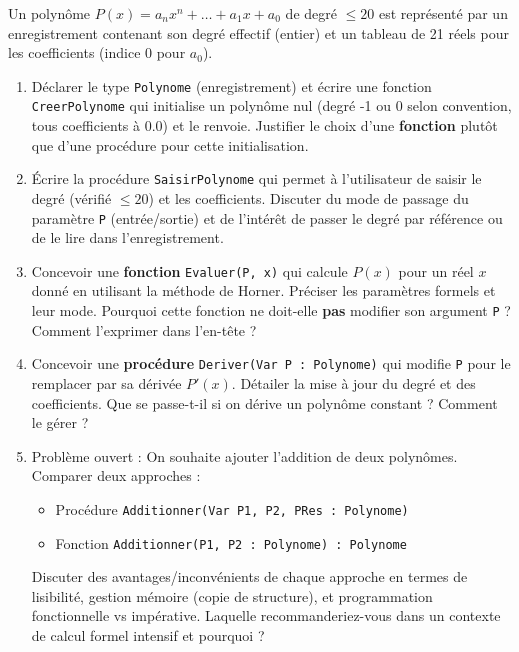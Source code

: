 \documentclass[11pt]{article}
\begin{document}
\begin{exercice}
Un polynôme $P(x) = a_n x^n + \dots + a_1 x + a_0$ de degré $\le 20$ est représenté par un enregistrement contenant son degré effectif (entier) et un tableau de 21 réels pour les coefficients (indice 0 pour $a_0$).

\begin{enumerate}
    \item Déclarer le type \texttt{Polynome} (enregistrement) et écrire une fonction \texttt{CreerPolynome} qui initialise un polynôme nul (degré -1 ou 0 selon convention, tous coefficients à 0.0) et le renvoie. Justifier le choix d'une \textbf{fonction} plutôt que d'une procédure pour cette initialisation.
    \item Écrire la procédure \texttt{SaisirPolynome} qui permet à l'utilisateur de saisir le degré (vérifié $\le 20$) et les coefficients. Discuter du mode de passage du paramètre \texttt{P} (entrée/sortie) et de l'intérêt de passer le degré par référence ou de le lire dans l'enregistrement.
    \item Concevoir une \textbf{fonction} \texttt{Evaluer(P, x)} qui calcule $P(x)$ pour un réel $x$ donné en utilisant la méthode de Horner. Préciser les paramètres formels et leur mode. Pourquoi cette fonction ne doit-elle \textbf{pas} modifier son argument \texttt{P} ? Comment l'exprimer dans l'en-tête ?
    \item Concevoir une \textbf{procédure} \texttt{Deriver(Var P : Polynome)} qui modifie \texttt{P} pour le remplacer par sa dérivée $P'(x)$. Détailer la mise à jour du degré et des coefficients. Que se passe-t-il si on dérive un polynôme constant ? Comment le gérer ?
    \item Problème ouvert : On souhaite ajouter l'addition de deux polynômes. Comparer deux approches :
    \begin{itemize}
        \item Procédure \texttt{Additionner(Var P1, P2, PRes : Polynome)}
        \item Fonction \texttt{Additionner(P1, P2 : Polynome) : Polynome}
    \end{itemize}
    Discuter des avantages/inconvénients de chaque approche en termes de lisibilité, gestion mémoire (copie de structure), et programmation fonctionnelle vs impérative. Laquelle recommanderiez-vous dans un contexte de calcul formel intensif et pourquoi ?
\end{enumerate}
\end{exercice}
\end{document}
